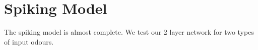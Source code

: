 \section{Spiking Model}

The spiking model is almost complete. 
We test our 2 layer network for two types of input odours. 